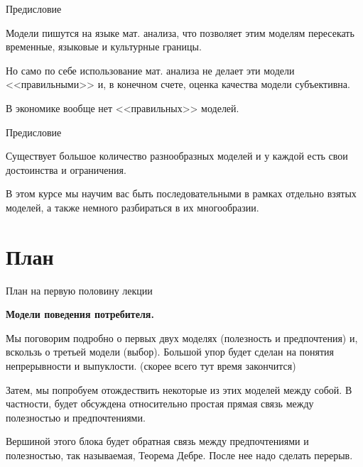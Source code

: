 \documentclass{beamer}
\begin{document}
\begin{frame}{Предисловие}

Модели пишутся на языке мат. анализа, что позволяет этим моделям пересекать временные, языковые и культурные границы. 

Но само по себе использование мат. анализа не делает эти модели <<правильными>>  и, в конечном счете, оценка качества модели субъективна.

В экономике вообще нет <<правильных>> моделей. 

\end{frame}
%
%
%
%
%
%
%
%
%
\begin{frame}{Предисловие}

Существует большое количество разнообразных моделей и у каждой есть свои достоинства и ограничения.

В этом курсе мы научим вас быть последовательными в рамках отдельно взятых моделей, а также немного разбираться в их многообразии.

\end{frame}

\section{План}

\begin{frame}{План на первую половину лекции}

\textbf{Модели поведения потребителя.}

Мы поговорим подробно о первых двух моделях (полезность и предпочтения) и, вскользь о третьей модели (выбор). Большой упор будет сделан на понятия непрерывности и выпуклости. (\alert{скорее всего тут время закончится})

Затем, мы попробуем отождествить некоторые из этих моделей между собой. В частности, будет обсуждена относительно простая прямая связь между полезностью и предпочтениями.

Вершиной этого блока будет обратная связь между предпочтениями и полезностью, так называемая, \alert{Теорема Дебре}. После нее надо сделать перерыв.

\end{frame}
\end{document}
